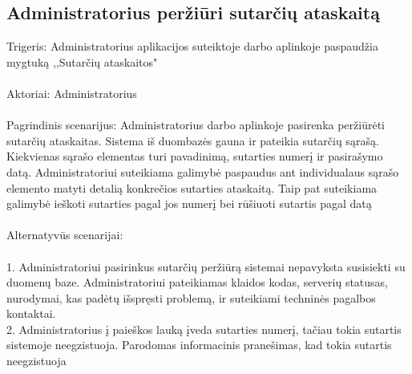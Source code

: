 \documentclass[oneside]{VUMIFPSkursinis}
\begin{document}
\subsection{Administratorius peržiūri sutarčių ataskaitą}
	Trigeris: Administratorius aplikacijos suteiktoje darbo aplinkoje paspaudžia mygtuką ,,Sutarčių ataskaitos"\\ \\
	Aktoriai: Administratorius \\ \\
	Pagrindinis scenarijus: Administratorius darbo aplinkoje pasirenka peržiūrėti sutarčių ataskaitas. Sistema iš duombazės gauna ir pateikia sutarčių sąrašą. Kiekvienas sąrašo elementas turi pavadinimą, sutarties numerį ir pasirašymo datą. Administratoriui suteikiama galimybė paspaudus ant individualaus sąrašo elemento matyti detalią konkrečios sutarties ataskaitą. Taip pat suteikiama galimybė ieškoti sutarties pagal jos numerį bei rūšiuoti sutartis pagal datą \\ \\
	Alternatyvūs scenarijai: \\ \\
1. Administratoriui pasirinkus sutarčių peržiūrą sistemai nepavyksta susisiekti su duomenų baze. Administratoriui pateikiamas klaidos kodas, serverių statusas, nurodymai, kas padėtų išspręsti problemą, ir suteikiami techninės pagalbos kontaktai. \\ 
2. Administratorius į paieškos lauką įveda sutarties numerį, tačiau tokia sutartis sistemoje neegzistuoja. Parodomas informacinis pranešimas, kad tokia sutartis neegzistuoja \\ \\
\end{document}
